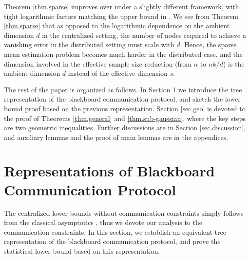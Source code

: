 \documentclass[final,12pt]{colt2018} %
\begin{document}
Theorem \ref{thm.sparse} improves over \cite{braverman2016communication} under a slightly different framework, with tight logarithmic factors matching the upper bound in \cite{garg2014communication}. We see from Theorem \ref{thm.sparse} that as opposed to the logarithmic dependence on the ambient dimension $d$ in the centralized setting, the number of nodes required to achieve a vanishing error in the distributed setting must scale with $d$. Hence, the sparse mean estimation problem becomes much harder in the distributed case, and the dimension involved in the effective sample size reduction (from $n$ to $nk/d$) is the ambient dimension $d$ instead of the effective dimension $s$.

The rest of the paper is organized as follows. In Section \ref{sec.blackboard} we introduce the tree representation of the blackboard communication protocol, and sketch the lower bound proof based on the previous representation. Section \ref{sec.geo} is devoted to the proof of Theorems \ref{thm.general} and \ref{thm.sub-gaussian}, where the key steps are two geometric inequalities. Further discussions are in Section \ref{sec.discussion}, and auxiliary lemmas and the proof of main lemmas are in the appendices.


\section{Representations of Blackboard Communication Protocol}\label{sec.blackboard}
The centralized lower bounds without communication constraints simply follows from the classical asymptotics \cite{Hajek1970characterization,Hajek1972local}, thus we devote our analysis to the communication constraints. In this section, we establish an equivalent tree representation of the blackboard communication protocol, and prove the statistical lower bound based on this representation.
\end{document}
